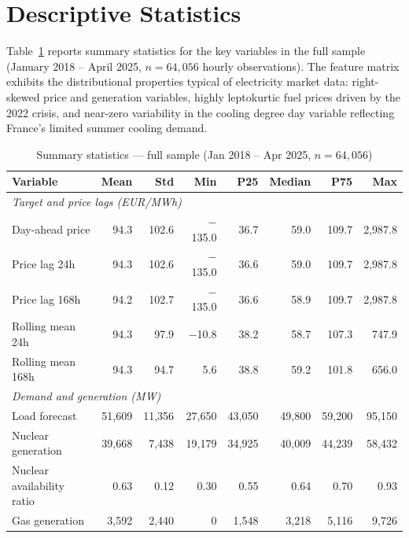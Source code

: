 \section{Descriptive Statistics}
\label{sec:descriptive}

Table~\ref{tab:desc_stats} reports summary statistics for the key variables in
the full sample (January 2018 -- April 2025, $n = 64{,}056$ hourly
observations). The feature matrix exhibits the distributional properties
typical of electricity market data: right-skewed price and generation variables,
highly leptokurtic fuel prices driven by the 2022 crisis, and near-zero
variability in the cooling degree day variable reflecting France's limited
summer cooling demand.

\begin{table}[H]
  \centering
  \small
  \caption{Summary statistics — full sample (Jan 2018 -- Apr 2025, $n=64{,}056$)}
  \label{tab:desc_stats}
  \begin{tabular}{lrrrrrrr}
    \toprule
    \textbf{Variable} & \textbf{Mean} & \textbf{Std} & \textbf{Min}
      & \textbf{P25} & \textbf{Median} & \textbf{P75} & \textbf{Max} \\
    \midrule
    \multicolumn{8}{l}{\textit{Target and price lags (EUR/MWh)}} \\
    Day-ahead price              & 94.3 & 102.6 & $-$135.0 &  36.7 &  59.0 & 109.7 & 2{,}987.8 \\
    Price lag 24h                & 94.3 & 102.6 & $-$135.0 &  36.6 &  59.0 & 109.7 & 2{,}987.8 \\
    Price lag 168h               & 94.2 & 102.7 & $-$135.0 &  36.6 &  58.9 & 109.7 & 2{,}987.8 \\
    Rolling mean 24h             & 94.3 &  97.9 &  $-$10.8 &  38.2 &  58.7 & 107.3 &   747.9 \\
    Rolling mean 168h            & 94.3 &  94.7 &     5.6  &  38.8 &  59.2 & 101.8 &   656.0 \\
    \midrule
    \multicolumn{8}{l}{\textit{Demand and generation (MW)}} \\
    Load forecast                & 51{,}609 & 11{,}356 & 27{,}650 & 43{,}050 & 49{,}800 & 59{,}200 & 95{,}150 \\
    Nuclear generation           & 39{,}668 &  7{,}438 & 19{,}179 & 34{,}925 & 40{,}009 & 44{,}239 & 58{,}432 \\
    Nuclear availability ratio   &   0.63 &   0.12 &    0.30 &    0.55 &    0.64 &    0.70 &    0.93 \\
    Gas generation               &  3{,}592 &  2{,}440 &       0 &  1{,}548 &  3{,}218 &  5{,}116 &  9{,}726 \\

\end{tabular}
\end{table}
